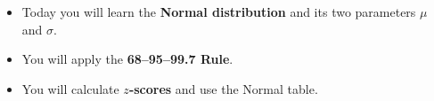 \documentclass[10pt]{article}
\begin{document}
\vspace{0.14in}

\begin{tcolorbox}[colback=greenbg, colframe=greenacc, boxrule=0.8pt, arc=2mm,
    left=4mm, right=4mm, top=3mm, bottom=3mm]
\small
\begin{itemize}[leftmargin=1.3em, itemsep=5pt]
  \item Today you will learn the \textbf{Normal distribution} and its two parameters
        $\mu$ and $\sigma$.
  \item You will apply the \textbf{68--95--99.7 Rule}.
  \item You will calculate \textbf{$z$-scores} and use the Normal table.
\end{itemize}
\end{tcolorbox}
\end{document}
